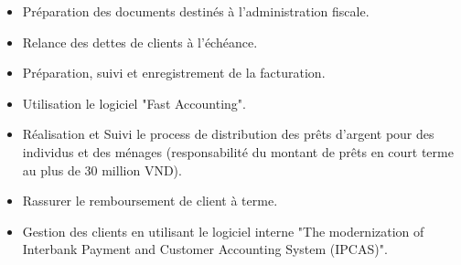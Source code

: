 \documentclass[10pt,a4paper]{altacv}
\begin{document}

\begin{fullwidth}
\makecvheader
\end{fullwidth}



\begin{itemize}
\item Préparation des documents destinés à l’administration fiscale.
\item Relance des dettes de clients à l'échéance.
\item Préparation, suivi et enregistrement de la facturation. 
\item Utilisation le logiciel "Fast Accounting".
\end{itemize}

\divider

\begin{itemize}
\item Réalisation et Suivi le process de distribution des prêts d'argent pour des individus et des ménages (responsabilité du montant de prêts en court terme au plus de 30 million VND).
\item Rassurer le remboursement de client à terme.
\item Gestion des clients en utilisant le logiciel interne "The modernization of Interbank Payment and Customer Accounting System (IPCAS)".
\end{itemize}
\end{document}
